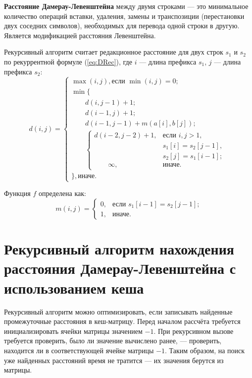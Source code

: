 \textbf{Расстояние Дамерау-Левенштейна} между двумя строками --- это минимальное количество операций вставки, удаления, замены и транспозиции (перестановки двух соседних символов), необходимых для перевода одной строки в другую. Является модификацией расстояния Левенштейна.

Рекурсивный алгоритм считает редакционное расстояние для двух строк $s_{1}$ и $s_{2}$ по рекуррентной формуле (\ref{eq:DRec}), где $i$ --- длина префикса $s_{1}$, $j$ --- длина префикса $s_{2}$:
\begin{equation}
	\label{eq:DRec}
	d(i, j) = \begin{cases}
		\max(i, j), \text{если }\min(i, j) = 0;\\
		\min \lbrace \\
			\qquad d(i, j-1) + 1;\\
			\qquad d(i-1, j) + 1;\\
			\qquad d(i-1, j-1) + m(a[i], b[j]);\\
			\qquad \begin{cases} 
				d(i-2, j-2) + 1, &\text{если }i,j > 1,\\
				\qquad &s_{1}[i] = s_{2}[j-1],\\
				\qquad &s_{2}[j] = s_{1}[i-1];\\
				\qquad \infty, & \text{иначе.}
			\end{cases}\\
		\rbrace, \text{иначе.}
		\end{cases}
\end{equation}

Функция $f$ определена как:
\begin{equation}
	\label{eq:Lm}
	m(i, j) = \begin{cases}
		0, &\text{если $s_{1}[i-1] = s_{2}[j-1]$;}\\
		1, &\text{иначе.}
	\end{cases}
\end{equation}

\section{Рекурсивный алгоритм нахождения расстояния Дамерау-Левенштейна с использованием кеша}

Рекурсивный алгоритм можно оптимизировать, если записывать найденные промежуточные расстояния в кеш-матрицу. Перед началом рассчёта требуется инициализировать ячейки матрицы значением $-1$. При рекурсивном вызове требуется проверить, было ли значение вычислено ранее, --- проверить, находится ли в соответствующей ячейке матрицы $-1$.
Таким образом, на поиск уже найденных расстояний время не тратится --- их значения берутся из матрицы.


